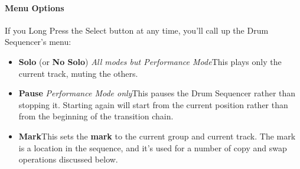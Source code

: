 \documentclass{article}
\newcommand\bump{\vspace{11in}}
\begin{document}
\paragraph{Menu Options}

If you Long Press the Select button at any time, you'll call up the Drum Sequencer's menu:%

\begin{itemize}
\item {\bf Solo} (or {\bf No Solo}) {\it All modes but Performance Mode}\quad This plays only the current track, muting the others.
\item {\bf Pause} {\it Performance Mode only}\quad This pauses the Drum Sequencer rather than stopping it.  Starting again will start from the current position rather than from the beginning of the transition chain.
\item {\bf Mark}\quad This sets the {\bf mark} to the current group and current track.  The mark is a location in the sequence, and it's used for a number of copy and swap operations discussed below.

\bump


\end{itemize}
\end{document}

